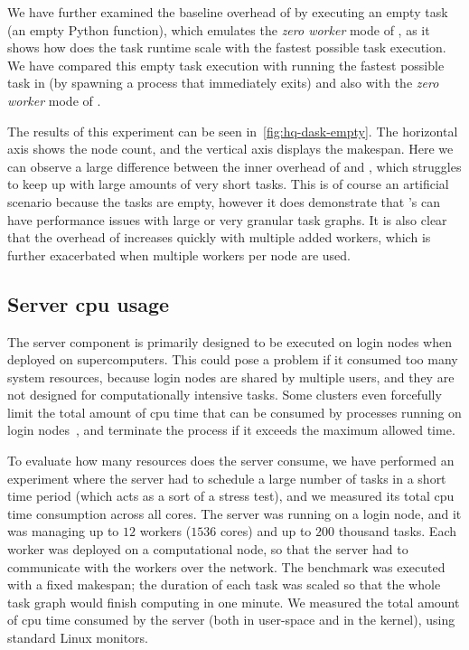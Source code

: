 We have further examined the baseline overhead of \dask{} by executing an empty
task (an empty Python function), which emulates the \emph{zero worker} mode of
\hyperqueue{}, as it shows how does the task runtime scale with the fastest possible task
execution. We have compared this empty task execution with running the fastest possible task in
\hyperqueue{} (by spawning a process that immediately exits) and also with the \emph{zero worker} mode of \hyperqueue{}.

The results of this experiment can be seen in~\autoref{fig:hq-dask-empty}. The horizontal axis shows
the node count, and the vertical axis displays the makespan. Here we can observe a large difference
between the inner overhead of \hyperqueue{} and \dask{}, which struggles
to keep up with large amounts of very short tasks. This is of course an artificial scenario because
the tasks are empty, however it does demonstrate that \dask{}'s can have
performance issues with large or very granular task graphs. It is also clear that the overhead of
\dask{} increases quickly with multiple added workers, which is further exacerbated
when multiple workers per node are used.


\subsection{Server \gls{cpu} usage}
\label{sec:hq-exp-server-cpu-usage}
The \hyperqueue{} server component is primarily designed to be executed on login nodes
when deployed on supercomputers. This could pose a problem if it consumed too many system
resources, because login nodes are shared by multiple users, and they are not designed for
computationally intensive tasks. Some clusters even forcefully limit the total amount of
\gls{cpu} time that can be consumed by processes running on login
nodes~\cite{leonardo_time_limit}, and terminate the process if it exceeds the maximum allowed time.

To evaluate how many resources does the server consume, we have performed an experiment where the server
had to schedule a large number of tasks in a short time period
(which acts as a sort of a stress test), and we measured its total \gls{cpu} time consumption
across all cores. The server was running on a login node, and it was managing up to
$12$ workers ($1536$ cores) and up to $200$
thousand tasks. Each worker was deployed on a computational node, so that the server had to
communicate with the workers over the network. The benchmark was executed with a fixed makespan;
the duration of each task was scaled so that the whole task graph would finish computing in one
minute. We measured the total amount of \gls{cpu} time consumed by the server (both
in user-space and in the kernel), using standard Linux monitors.

